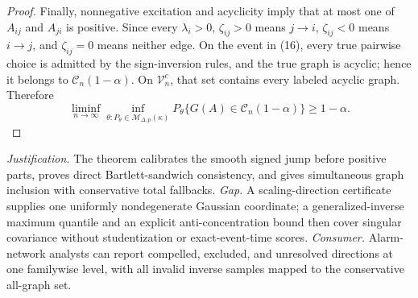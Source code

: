 \documentclass{article}
\begin{document}
\begin{proof}
Finally, nonnegative excitation and acyclicity imply that at most one of \(A_{ij}\) and \(A_{ji}\) is positive.  Since every \(\lambda_i>0\), \(\zeta_{ij}>0\) means \(j\to i\), \(\zeta_{ij}<0\) means \(i\to j\), and \(\zeta_{ij}=0\) means neither edge.  On the event in (16), every true pairwise choice is admitted by the sign-inversion rules, and the true graph is acyclic; hence it belongs to \(\mathcal C_n(1-\alpha)\).  On \(\mathcal V_n^c\), that set contains every labeled acyclic graph.  Therefore
\[
 \liminf_{n\to\infty}\inf_{\theta:P_\theta\in\mathcal M_{\Delta,p}(\kappa)}
 P_\theta\{G(A)\in\mathcal C_n(1-\alpha)\}\geq1-\alpha.
\]
\end{proof}
\par\smallskip\noindent \textit{Justification.} The theorem calibrates the smooth signed jump before positive parts, proves direct Bartlett-sandwich consistency, and gives simultaneous graph inclusion with conservative total fallbacks. \textit{Gap.} A scaling-direction certificate supplies one uniformly nondegenerate Gaussian coordinate; a generalized-inverse maximum quantile and an explicit anti-concentration bound then cover singular covariance without studentization or exact-event-time scores. \textit{Consumer.} Alarm-network analysts can report compelled, excluded, and unresolved directions at one familywise level, with all invalid inverse samples mapped to the conservative all-graph set.
\end{document}
